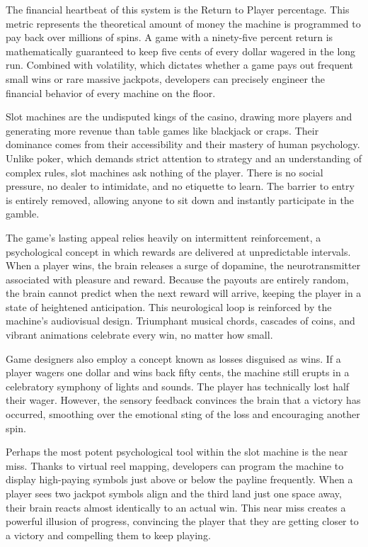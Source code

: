 \documentclass[12pt,twoside,openany]{book}
\begin{document}
The financial heartbeat of this system is the Return to Player percentage. This metric represents the theoretical amount of money the machine is programmed to pay back over millions of spins. A game with a ninety-five percent return is mathematically guaranteed to keep five cents of every dollar wagered in the long run. Combined with volatility, which dictates whether a game pays out frequent small wins or rare massive jackpots, developers can precisely engineer the financial behavior of every machine on the floor.

Slot machines are the undisputed kings of the casino, drawing more players and generating more revenue than table games like blackjack or craps. Their dominance comes from their accessibility and their mastery of human psychology. Unlike poker, which demands strict attention to strategy and an understanding of complex rules, slot machines ask nothing of the player. There is no social pressure, no dealer to intimidate, and no etiquette to learn. The barrier to entry is entirely removed, allowing anyone to sit down and instantly participate in the gamble.

The game's lasting appeal relies heavily on intermittent reinforcement, a psychological concept in which rewards are delivered at unpredictable intervals. When a player wins, the brain releases a surge of dopamine, the neurotransmitter associated with pleasure and reward. Because the payouts are entirely random, the brain cannot predict when the next reward will arrive, keeping the player in a state of heightened anticipation. This neurological loop is reinforced by the machine's audiovisual design. Triumphant musical chords, cascades of coins, and vibrant animations celebrate every win, no matter how small.

Game designers also employ a concept known as losses disguised as wins. If a player wagers one dollar and wins back fifty cents, the machine still erupts in a celebratory symphony of lights and sounds. The player has technically lost half their wager. However, the sensory feedback convinces the brain that a victory has occurred, smoothing over the emotional sting of the loss and encouraging another spin.

Perhaps the most potent psychological tool within the slot machine is the near miss. Thanks to virtual reel mapping, developers can program the machine to display high-paying symbols just above or below the payline frequently. When a player sees two jackpot symbols align and the third land just one space away, their brain reacts almost identically to an actual win. This near miss creates a powerful illusion of progress, convincing the player that they are getting closer to a victory and compelling them to keep playing.
\end{document}
